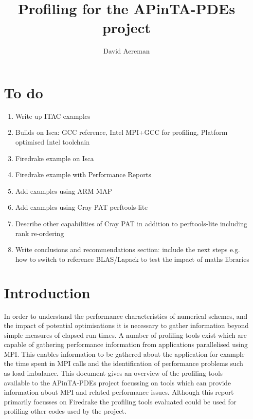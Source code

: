 \documentclass[a4paper,titlepage]{article}
\author{David Acreman}
\title{Profiling for the APinTA-PDEs project}
\begin{document}
\pagestyle{fancy}
\lhead{}
\chead{}

\maketitle
\pagebreak
\tableofcontents
\pagebreak


\section*{To do}

\begin{enumerate}
\item Write up ITAC examples
\item Builds on Isca: GCC reference, Intel MPI+GCC for profiling, Platform optimised Intel toolchain
\item Firedrake example on Isca
\item Firedrake example with Performance Reports
\item Add examples using ARM MAP
\item Add examples using Cray PAT perftools-lite
\item Describe other capabilities of Cray PAT in addition to perftools-lite including rank re-ordering
\item Write conclusions and recommendations section: include the next steps e.g. how to switch to reference BLAS/Lapack to test the impact of maths libraries
\end{enumerate}




\section{Introduction}

In order to understand the performance characteristics of numerical schemes, and the impact of potential optimisations it is necessary to gather information beyond simple measures of elapsed run times. A number of profiling tools exist which are capable of gathering performance information from applications parallelised using MPI. This enables information to be gathered about the application for example the time spent in MPI calls and the identification of performance problems such as load imbalance. This document gives an overview of the profiling tools available to the APinTA-PDEs project focussing on tools which can provide information about MPI and related performance issues. Although this report primarily focusses on Firedrake the profiling tools evaluated could be used for profiling other codes used by the project.
\end{document}
